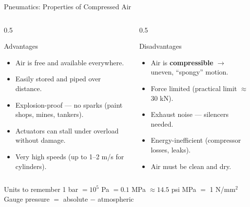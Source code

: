 \documentclass[aspectratio=169]{beamer}
\begin{document}
	\begin{frame}{Pneumatics: Properties of Compressed Air}
		\begin{columns}[T]
			\begin{column}{0.5\textwidth}
				\begin{block}{Advantages}
					\begin{itemize}\small
						\item Air is free and available everywhere.
						\item Easily stored and piped over distance.
						\item Explosion-proof --- no sparks (paint shops, mines, tankers).
						\item Actuators can stall under overload without damage.
						\item Very high speeds (up to 1--2 m/s for cylinders).
					\end{itemize}
				\end{block}
			\end{column}
			\begin{column}{0.5\textwidth}
				\begin{block}{Disadvantages}
					\begin{itemize}\small
						\item Air is \textbf{compressible} $\rightarrow$ uneven, ``spongy'' motion.
						\item Force limited (practical limit $\approx$ 30 kN).
						\item Exhaust noise --- silencers needed.
						\item Energy-inefficient (compressor losses, leaks).
						\item Air must be clean and dry.
					\end{itemize}
				\end{block}
			\end{column}
		\end{columns}
		\vspace{0.3cm}
		\begin{block}{Units to remember}
			\centering\small
			1 bar $= 10^5$ Pa $= 0.1$ MPa $\approx 14.5$ psi  MPa $=$ 1 N/mm$^2$ \qquad Gauge pressure $=$ absolute $-$ atmospheric
		\end{block}
	\end{frame}
\end{document}
